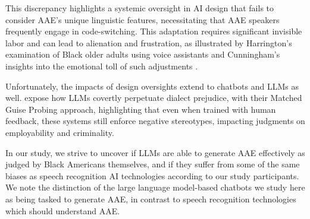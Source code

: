 This discrepancy highlights a systemic oversight in AI design that fails to consider AAE’s unique linguistic features, necessitating that AAE speakers frequently engage in code-switching. This adaptation requires significant invisible labor and can lead to alienation and frustration, as illustrated by Harrington's examination of Black older adults using voice assistants \cite{harrington} and Cunningham's insights into the emotional toll of such adjustments \cite{Cunningham2024Impacts}.

Unfortunately, the impacts of design oversights extend to chatbots and LLMs as well. \citet{hofmann2024dialect} expose how LLMs covertly perpetuate dialect prejudice, with their Matched Guise Probing approach, highlighting that even when trained with human feedback, these systems still enforce negative stereotypes, impacting judgments on employability and criminality.

In our study, we strive to uncover if LLMs are able to generate AAE effectively as judged by Black Americans themselves, and if they suffer from some of the same biases as speech recognition AI technologies according to our study participants. We note the distinction of the large language model-based chatbots we study here as being tasked to generate AAE, in contrast to speech recognition technologies which should understand AAE. 



